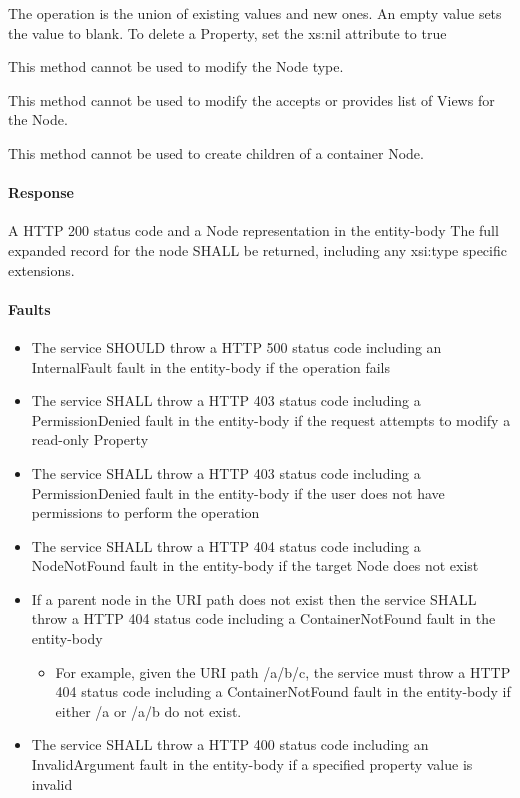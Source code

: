 \documentclass[11pt,a4paper]{ivoa}
\begin{document}
The operation is the union of existing values and new ones.  An empty value sets the value to blank.  To delete a Property, set the xs:nil attribute to true

This method cannot be used to modify the Node type.

This method cannot be used to modify the accepts or provides list of Views for the Node.

This method cannot be used to create children of a container Node.

\paragraph{Response}
A HTTP 200 status code and a Node representation in the entity-body
The full expanded record for the node SHALL be returned, including any xsi:type specific extensions.

\paragraph{Faults}
\begin{itemize}
    \item The service SHOULD throw a HTTP 500 status code including an InternalFault fault in the entity-body if the operation fails
    \item The service SHALL throw a HTTP 403 status code including a PermissionDenied fault in the entity-body if the request attempts to modify a read-only Property
    \item The service SHALL throw a HTTP 403 status code including a PermissionDenied fault in the entity-body if the user does not have permissions to perform the operation
    \item The service SHALL throw a HTTP 404 status code including a NodeNotFound fault in the entity-body if the target Node does not exist
    \item If a parent node in the URI path does not exist then the service SHALL throw a HTTP 404 status code including a ContainerNotFound fault in the entity-body
    \begin{itemize}
        \item For example, given the URI path /a/b/c, the service must throw a HTTP 404 status code including a ContainerNotFound fault in the entity-body if either /a or /a/b do not exist.
    \end{itemize}
    \item The service SHALL throw a HTTP 400 status code including an InvalidArgument fault in the entity-body if a specified property value is invalid
\end{itemize}
\end{document}
